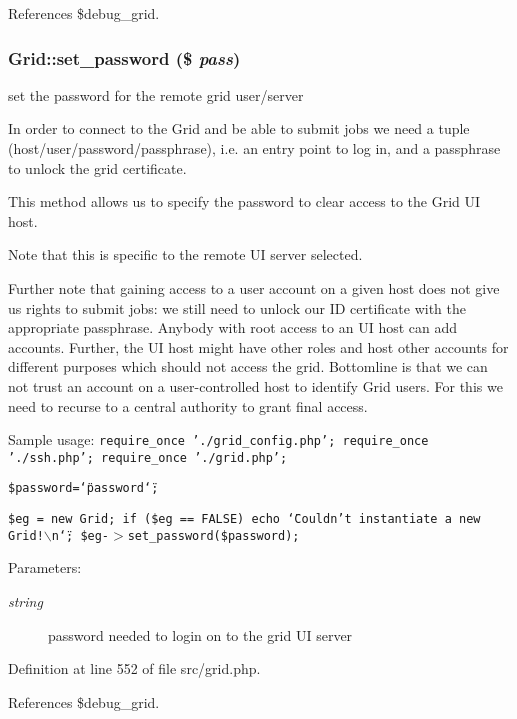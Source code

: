 References \$debug\_\-grid.
\subsubsection{\setlength{\rightskip}{0pt plus 5cm}Grid::set\_\-password (\$ {\em pass})}\label{classGrid_a4}


set the password for the remote grid user/server 

In order to connect to the Grid and be able to submit jobs we need a tuple (host/user/password/passphrase), i.e. an entry point to log in, and a passphrase to unlock the grid certificate.

This method allows us to specify the password to clear access to the Grid UI host.

Note that this is specific to the remote UI server selected.

Further note that gaining access to a user account on a given host does not give us rights to submit jobs: we still need to unlock our ID certificate with the appropriate passphrase. Anybody with root access to an UI host can add accounts. Further, the UI host might have other roles and host other accounts for different purposes which should not access the grid. Bottomline is that we can not trust an account on a user-controlled host to identify Grid users. For this we need to recurse to a central authority to grant final access.

Sample usage: {\tt  require\_\-once './grid\_\-config.php'; require\_\-once './ssh.php'; require\_\-once './grid.php';}

{\tt  \$password=\char`\"{}password\char`\"{};}

{\tt  \$eg = new Grid; if (\$eg == FALSE) echo \char`\"{}Couldn't instantiate a new Grid!$\backslash$n\char`\"{}; \$eg-$>$set\_\-password(\$password); }

\begin{Desc}
\item[Parameters:]
\begin{description}
\item[{\em string}]password needed to login on to the grid UI server \end{description}
\end{Desc}


Definition at line 552 of file src/grid.php.

References \$debug\_\-grid.
